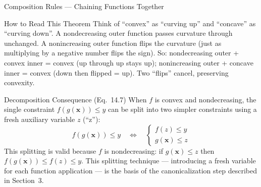 \documentclass[aspectratio=169,10pt]{beamer}
\begin{document}
\begin{frame}[allowframebreaks]{Composition Rules --- Chaining Functions Together}
  \begin{alertblock}{How to Read This Theorem}
    Think of ``convex'' as ``curving up'' and ``concave'' as ``curving
    down''.  A nondecreasing outer function passes curvature through
    unchanged.  A nonincreasing outer function flips the curvature
    (just as multiplying by a negative number flips the sign).  So:
    nondecreasing outer + convex inner = convex (up through up stays up);
    nonincreasing outer + concave inner = convex (down then flipped =
    up).  Two ``flips'' cancel, preserving convexity.
  \end{alertblock}

  \begin{block}{Decomposition Consequence (Eq.\ 14.7)}
    When $f$ is convex and nondecreasing, the single constraint
    $f(g(\mathbf{x})) \leq y$ can be split into two simpler
    constraints using a fresh auxiliary variable $z$ (``z''):
    \[
      f(g(\mathbf{x})) \leq y \quad\iff\quad
      \begin{cases}f(z) \leq y\\[4pt]g(\mathbf{x}) \leq z\end{cases}
    \]
    This splitting is valid because $f$ is nondecreasing: if
    $g(\mathbf{x}) \leq z$ then $f(g(\mathbf{x})) \leq f(z) \leq y$.
    This splitting technique --- introducing a fresh variable for each
    function application --- is the basis of the canonicalization step
    described in Section~3.
  \end{block}

\end{frame}
\end{document}
